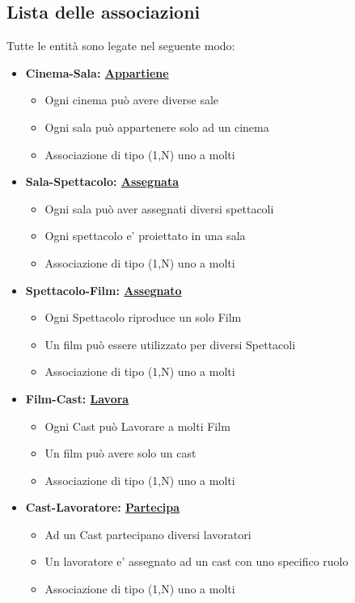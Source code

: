 \documentclass[10pt]{article}
\begin{document}
	\subsection{Lista delle associazioni}
	Tutte le entità sono legate nel seguente modo:
	\begin{itemize}
	    \item {\textbf{Cinema-Sala: \underline{Appartiene}}
		    \begin{itemize}
			    \item Ogni cinema può avere diverse sale
			    \item Ogni sala può appartenere solo ad un cinema
			    \item Associazione di tipo (1,N) uno a molti
		    \end{itemize}}
		    
		\item {\textbf{Sala-Spettacolo: \underline{Assegnata}}
		    \begin{itemize}
			    \item Ogni sala può aver assegnati diversi spettacoli
			    \item Ogni spettacolo e' proiettato in una sala
			    \item Associazione di tipo (1,N) uno a molti
		    \end{itemize}}
		        
		\item {\textbf{Spettacolo-Film: \underline{Assegnato}}
		    \begin{itemize}
			    \item Ogni Spettacolo riproduce un solo Film
			    \item Un film può essere utilizzato per diversi Spettacoli 
			    \item Associazione di tipo (1,N) uno a molti
		    \end{itemize}}
		    
		\item {\textbf{Film-Cast: \underline{Lavora}}
		    \begin{itemize}
			    \item Ogni Cast può Lavorare a molti Film
			    \item Un film può avere solo un cast 
			    \item Associazione di tipo (1,N) uno a molti
		    \end{itemize}}
		
		\item {\textbf{Cast-Lavoratore: \underline{Partecipa}}
		    \begin{itemize}
			    \item Ad un Cast partecipano diversi lavoratori
			    \item Un lavoratore e' assegnato ad un cast con uno specifico ruolo
			    \item Associazione di tipo (1,N) uno a molti
		    \end{itemize}}
		  

\end{itemize}
\end{document}
